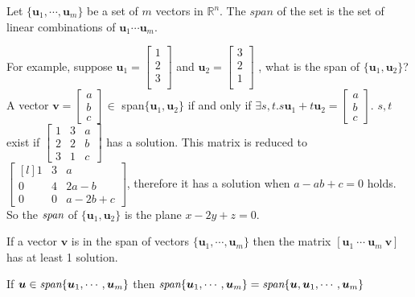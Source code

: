 \begin{definition}[Span]
Let $\{\bm{u}_1,\cdots,\bm{u}_m\}$ be a set of $m$ vectors in $\mathbb{R}^n$. The $span$ of the set is the set of linear combinations of $\bm{u}_1\cdots\bm{u}_m$.
\end{definition}
For example, suppose
$\bm{u}_1=\begin{bmatrix}
1\\2\\3\\
\end{bmatrix}$
and
$\bm{u}_2=\begin{bmatrix}
3\\2\\1\\
\end{bmatrix}$
, what is the span of $\{\bm{u}_1, \bm{u}_2\}$?
A vector $\bm{v}=\begin{bmatrix}a\\b\\c\end{bmatrix}\in$ span$\{\bm{u}_1,\bm{u}_2\}$
if and only if $\exists s, t \bm{.} s\bm{u}_1 + t\bm{u}_2=\begin{bmatrix}a\\b\\c\end{bmatrix}$. $s, t$ exist if 
$
    \begin{bmatrix}
    1 & 3 & a\\
    2 & 2 & b\\
    3 & 1 & c
    \end{bmatrix}
$ has a solution. This matrix is reduced to $
    \begin{bmatrix*}[l]
    1 & 3 & a\\
    0 & 4 & 2a-b\\
    0 & 0 & a-2b+c
    \end{bmatrix*}
$, therefore it has a solution when $a-ab+c=0$ holds. So the $\emph{span}$ of $\{\bm{u}_1, \bm{u}_2\}$ is the plane $x-2y+z=0$. 

\begin{definition}
If a vector $\bm{v}$ is in the span of vectors $\{\bm{u}_1, \cdots, \bm{u}_m\}$ then the matrix $[\bm{u}_1\ \cdots\ \bm{u}_m \ \bm{v}]$ has at least 1 solution.
\end{definition}

\begin{theorem}
If $\bm{u}\in\emph{span}\{\bm{u}_1,\cdots,\bm{u}_m\}$ then $\emph{span}\{\bm{u}_1,\cdots,\bm{u}_m\}=\emph{span}\{\bm{u},\bm{u}_1,\cdots,\bm{u}_m\}$ 
\end{theorem}

